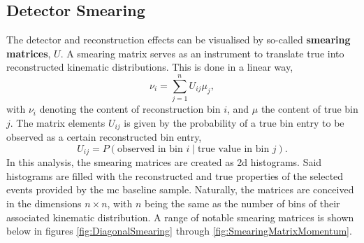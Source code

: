 \subsection{Detector Smearing} \label{sec:DetectorSmearing}
The detector and reconstruction effects can be visualised by so-called \textbf{smearing matrices}, $U$. A smearing matrix serves as an instrument to translate true into reconstructed kinematic distributions. This is done in a linear way,
\begin{equation}
    \nu_i = \sum_{j=1}^{n} U_{ij} \mu_j,
\end{equation}
with $\nu_i$ denoting the content of reconstruction bin $i$, and $\mu$ the content of true bin $j$. The matrix elements $U_{ij}$ is given by the probability of a true bin entry to be observed as a certain reconstructed bin entry, \ie
\begin{equation}
    U_{ij} = P\left( \text{observed in bin } i \mid \text{true value in bin } j\right).
\end{equation}
In this analysis, the smearing matrices are created as \gls{2d} histograms. Said histograms are filled with the reconstructed and true properties of the selected events provided by the \gls{mc} baseline sample. Naturally, the matrices are conceived in the dimensions $n \times n$, with $n$ being the same as the number of bins of their associated kinematic distribution. A range of notable smearing matrices is shown below in figures \ref{fig:DiagonalSmearing} through \ref{fig:SmearingMatrixMomentum}.
